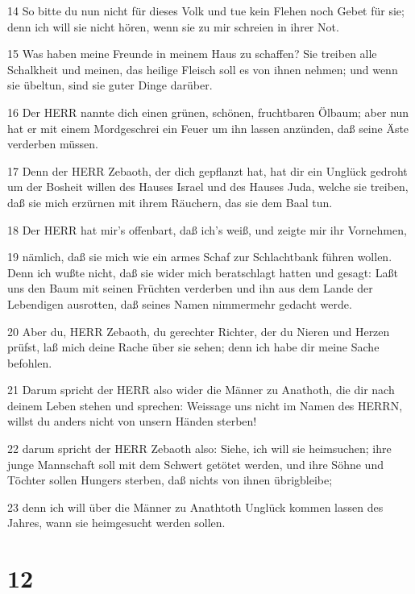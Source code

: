\par 14 So bitte du nun nicht für dieses Volk und tue kein Flehen noch Gebet für sie; denn ich will sie nicht hören, wenn sie zu mir schreien in ihrer Not.
\par 15 Was haben meine Freunde in meinem Haus zu schaffen? Sie treiben alle Schalkheit und meinen, das heilige Fleisch soll es von ihnen nehmen; und wenn sie übeltun, sind sie guter Dinge darüber.
\par 16 Der HERR nannte dich einen grünen, schönen, fruchtbaren Ölbaum; aber nun hat er mit einem Mordgeschrei ein Feuer um ihn lassen anzünden, daß seine Äste verderben müssen.
\par 17 Denn der HERR Zebaoth, der dich gepflanzt hat, hat dir ein Unglück gedroht um der Bosheit willen des Hauses Israel und des Hauses Juda, welche sie treiben, daß sie mich erzürnen mit ihrem Räuchern, das sie dem Baal tun.
\par 18 Der HERR hat mir's offenbart, daß ich's weiß, und zeigte mir ihr Vornehmen,
\par 19 nämlich, daß sie mich wie ein armes Schaf zur Schlachtbank führen wollen. Denn ich wußte nicht, daß sie wider mich beratschlagt hatten und gesagt: Laßt uns den Baum mit seinen Früchten verderben und ihn aus dem Lande der Lebendigen ausrotten, daß seines Namen nimmermehr gedacht werde.
\par 20 Aber du, HERR Zebaoth, du gerechter Richter, der du Nieren und Herzen prüfst, laß mich deine Rache über sie sehen; denn ich habe dir meine Sache befohlen.
\par 21 Darum spricht der HERR also wider die Männer zu Anathoth, die dir nach deinem Leben stehen und sprechen: Weissage uns nicht im Namen des HERRN, willst du anders nicht von unsern Händen sterben!
\par 22 darum spricht der HERR Zebaoth also: Siehe, ich will sie heimsuchen; ihre junge Mannschaft soll mit dem Schwert getötet werden, und ihre Söhne und Töchter sollen Hungers sterben, daß nichts von ihnen übrigbleibe;
\par 23 denn ich will über die Männer zu Anathtoth Unglück kommen lassen des Jahres, wann sie heimgesucht werden sollen.

\chapter{12}

